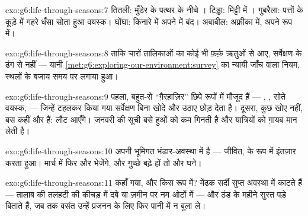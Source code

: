 \begin{solution}{exo:g6:life-through-seasons:7}
तितली: मुँडेर के पत्थर के नीचे । टिड्डा: मिट्टी में ।
गुबरैला: पत्तों के कूड़े में गहरे धँसा सोता हुआ वयस्क। घोंघा: किनारे में
अपने  में बंद। अबाबील: अफ़्रीका में, अपने  रूप में।
\end{solution}

\begin{solution}{exo:g6:life-through-seasons:8}
ताकि चारों तालिकाओं का कोई भी फ़र्क़ ऋतुओं से आए, सर्वेक्षण के ढंग से
नहीं --- यानी \cref{met:g6:exploring-our-environment:survey} का न्यायी
जाँच वाला नियम, स्थलों के बजाय समय पर लगाया हुआ।
\end{solution}

\begin{solution}{exo:g6:life-through-seasons:9}
पहला, बहुत-से ``ग़ैरहाज़िर'' छिपे रूपों में मौजूद हैं --- , ,
सोते वयस्क,  --- जिन्हें टहलकर किया गया सर्वेक्षण बिना खोदे और
उठाए छोड़ देता है। दूसरा, कुछ खोए नहीं, बस कहीं और हैं:  लौट
आएँगे। जनवरी की सूची बसे हुओं को कम गिनती है और यात्रियों को ग़ायब मान
लेती है।
\end{solution}

\begin{solution}{exo:g6:life-through-seasons:10}
 अपनी भूमिगत भंडार-अवस्था में है --- जीवित,  के रूप में
इंतज़ार करता हुआ। मार्च में  फिर  और  भेजेंगे, और
गुच्छे बढ़े हों तो और घने।
\end{solution}

\begin{solution}{exo:g6:life-through-seasons:11}
कहाँ गया, और किस रूप में? मेंढक सर्दी सुप्त अवस्था में काटते हैं ---
तालाब की तलहटी की कीचड़ में दबे या ज़मीन पर नम ओटों में --- और ठंड के
महीने सुस्त पड़े बिताते हैं, जब तक वसंत उन्हें प्रजनन के लिए फिर पानी
में न बुला ले।
\end{solution}

